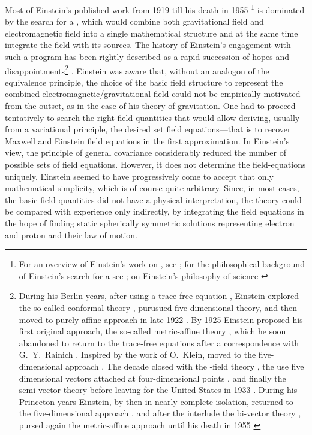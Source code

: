 \documentclass[draft]{article}
\newcommand{\FP}{\german{Fernparallelismus}\xspace}
\begin{document}
Most of Einstein's published work from 1919 till his death in 1955 \citep{Einstein1955-07}\footnote{For an overview of Einstein's work on \uftp, see \citet{Sauer2014}; for the philosophical background of Einstein's search for a \uft see \citet{Dongen2010}; on Einstein's philosophy of science \citet{Ryckman2017}} is dominated by the search for a \uft, which would combine both gravitational field and electromagnetic field into a single mathematical structure and at the same time integrate the field with its sources. The history of Einstein's engagement with such a program has been rightly described as a rapid succession of hopes and disappointments\footnote{During his Berlin years, after using a trace-free equation \citep{Einstein1919}, Einstein explored the so-called conformal theory \citep{Einstein1921c}, purusued  five-dimensional theory, and then moved to  purely affine approach in late 1922 \citep{Einstein1923c,Einstein1923d,Einstein1923e}. By 1925 Einstein proposed his first original approach, the so-called metric-affine theory \citep{Einstein1925a}, which he soon abandoned to return to the trace-free equations after a correspondence with G.~Y.~Rainich \citep{Einstein1927c}. Inspired by the work of O.~Klein, moved to the five-dimensional approach \citep{Einstein19271,Einstein19272}. The decade closed with the \FP-field theory \citep{Einstein19281,Einstein19282,Einstein1929b,Einstein1930g}, the use five dimensional vectors attached at four-dimensional points \cite{Einstein1931,Einstein1932}, and finally the semi-vector theory before leaving for the United States in 1933 \citep{Einstein1932c,Einstein1933c,Einstein1934b,Einstein1933d}. During his Princeton years Einstein, by then in nearly complete isolation, returned to the five-dimensional approach \citep{Einstein1938a}, and after the interlude the bi-vector theory \citep{Einstein1944a,Einstein1944}, pursed again the metric-affine approach until his death in 1955 \citep{Einstein1945,Einstein1945-04,Einstein1955-07}} \citep[187]{Vizgin1994}. Einstein was aware that, without an analogon of the equivalence principle, the choice of the basic field structure to represent the combined electromagnetic/gravitational field could not be empirically motivated from the outset, as in the case of his theory of gravitation. One had to proceed tentatively to search the right field quantities that would allow deriving, usually from a variational principle, the desired set field equations---that is to recover Maxwell and Einstein field equations in the first approximation. In Einstein's view, the principle of general covariance considerably reduced the number of possible sets of field equations. However, it does not determine the field-equations uniquely. Einstein seemed to have progressively come to accept that only mathematical simplicity, which is of course quite arbitrary. Since, in most cases, the basic field quantities did not have a physical interpretation, the theory could be compared with experience only indirectly, by integrating the field equations in the hope of finding static spherically symmetric solutions representing electron and proton and their law of motion. 
\end{document}
